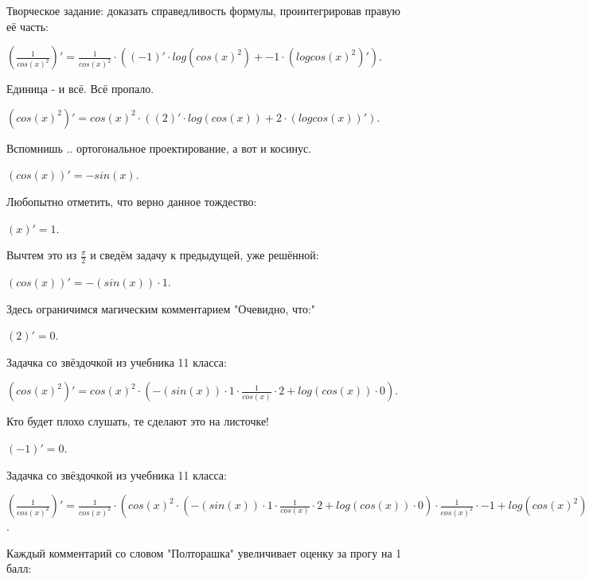 \documentclass{article}
\begin{document}
Творческое задание: доказать справедливость формулы, проинтегрировав правую её часть:\\
\begin{center}$( \frac {1} {{{cos(x)^{{2}}}}})'= \frac {1} {{{cos(x)^{{2}}}}} \cdot (({{-1}})'\cdot log({cos(x)^{{2}}}) + {{-1}} \cdot (log{cos(x)^{{2}}})')$.\end{center}
Единица - и всё. Всё пропало.\\
\begin{center}$({cos(x)^{{2}}})'={cos(x)^{{2}}} \cdot (({{2}})'\cdot log(cos(x)) + {{2}} \cdot (logcos(x))')$.\end{center}
Вспомнишь .. ортогональное проектирование, а вот и косинус.\\
\begin{center}$(cos(x))'= -sin(x)$.\end{center}
Любопытно отметить, что верно данное тождество:\\
\begin{center}$(x)' = 1$.\end{center}
Вычтем это из $\frac {\pi} {2}$ и сведём задачу к предыдущей, уже решённой:\\
\begin{center}$(cos(x))'= -(sin(x)) \cdot {1}$.\end{center}
Здесь ограничимся магическим комментарием "Очевидно, что:"\\
\begin{center}$({2})' = 0$.\end{center}
Задачка со звёздочкой из учебника 11 класса:\\
\begin{center}$({cos(x)^{{2}}})'= {cos(x)^{{2}}} \cdot (-(sin(x)) \cdot {1} \cdot  \frac {1} {{cos(x)}} \cdot {{2}}+log(cos(x)) \cdot {0})$.\end{center}
Кто будет плохо слушать, те сделают это на листочке!\\
\begin{center}$({-1})' = 0$.\end{center}
Задачка со звёздочкой из учебника 11 класса:\\
\begin{center}$( \frac {1} {{{cos(x)^{{2}}}}})'=  \frac {1} {{{cos(x)^{{2}}}}} \cdot ({cos(x)^{{2}}} \cdot (-(sin(x)) \cdot {1} \cdot  \frac {1} {{cos(x)}} \cdot {{2}}+log(cos(x)) \cdot {0}) \cdot  \frac {1} {{{cos(x)^{{2}}}}} \cdot {{-1}}+log({cos(x)^{{2}}}) \cdot {0})$.\end{center}
Каждый комментарий со словом "Полторашка" увеличивает оценку за прогу на 1 балл:\\
\end{document}
